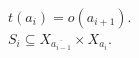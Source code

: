 \documentclass[preview]{standalone}
\begin{document}
$t(a_i) = o(a_{i+1})$.\\$S_i \subseteq X_{\overline{a_{i-1}}} \times X_{a_i}$.\\
\end{document}
